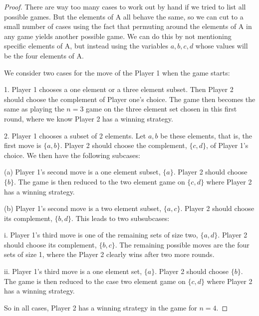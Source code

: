 \documentclass[14pt]{extarticle}
\begin{document}
\begin{proof}
There are way too many cases to work out by hand if we tried to list all possible games. But the elements of A all behave the same, so we can cut to a small number of cases using the fact that permuting around the elements of A in any game yields another possible game. We can do this by not mentioning specific elements of A, but instead using the variables $a, b, c, d$ whose values
will be the four elements of A.

We consider two cases for the move of the Player 1 when the game starts:

1. Player 1 chooses a one element or a three element subset. Then Player 2 should choose the complement of Player one’s choice. The game then becomes the same as playing the $n = 3$ game on the three element set chosen in this first round, where we know Player 2 has a winning strategy.

2. Player 1 chooses a subset of 2 elements. Let $a, b$ be these elements, that is, the first move is $\{a, b\}$. Player 2 should choose the complement, $\{c, d\}$, of Player 1’s choice. We then have the following subcases:

(a) Player 1’s second move is a one element subset, $\{a\}$. Player 2 should choose $\{b\}$. The game is then reduced to the two element game on $\{c, d\}$ where Player 2 has a winning strategy.

(b) Player 1’s second move is a two element subset, $\{a, c\}$. Player 2 should choose its com­plement, $\{b, d\}$. This leads to two subsubcases:

i. Player 1’s third move is one of the remaining sets of size two, $\{a, d\}$. Player 2 should choose its complement, $\{b, c\}$. The remaining possible moves are the four sets of size 1, where the Player 2 clearly wins after two more rounds.

ii. Player 1’s third move is a one element set, $\{a\}$. Player 2 should choose $\{b\}$. The game is then reduced to the case two element game on $\{c, d\}$ where Player 2 has a winning strategy.

So in all cases, Player 2 has a winning strategy in the game for $n = 4$.
\end{proof}
\end{document}
